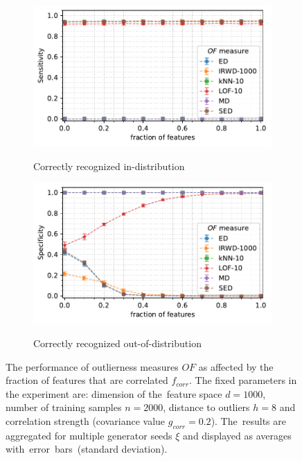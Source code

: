 \begin{figure}[t]
\begin{subfigure}[b]{0.495\textwidth}
        \centering
        \caption{\small Correctly recognized in-distribution}
        \includegraphics[width=\textwidth]{images/correlations/f_corr/trend-correlations-sens_95(n_correlated)-covariance_0.20-distance_8-outliers_correlated_False-model_ED,IRWD-1000,kNN-10,LOF-10,MD,SED-aggregated.pdf}
        \label{fig:n_correlated-sensitivity}
    \end{subfigure}
    \hfill
    \begin{subfigure}[b]{0.495\textwidth}
        \centering
        \caption{\small Correctly recognized out-of-distribution}
        \includegraphics[width=\textwidth]{images/correlations/f_corr/trend-correlations-spec_95(n_correlated)-covariance_0.20-distance_8-outliers_correlated_False-model_ED,IRWD-1000,kNN-10,LOF-10,MD,SED-aggregated.pdf}
        \label{fig:n_correlated-specificity}
    \end{subfigure}
    \caption{The performance of outlierness measures $OF$ as affected by the fraction of features that are correlated $f_{corr}$. The fixed parameters in the experiment are: dimension of the~feature space $d = 1000$, number of training samples $n = 2000$, distance to outliers $h = 8$ and correlation strength (covariance value $g_{corr} = 0.2$). The~results are aggregated for multiple generator seeds $\xi$ and displayed as averages with~error~bars~(standard deviation).}
    \label{fig:n_correlated}
    \vspace{-2.3em}
\end{figure}

